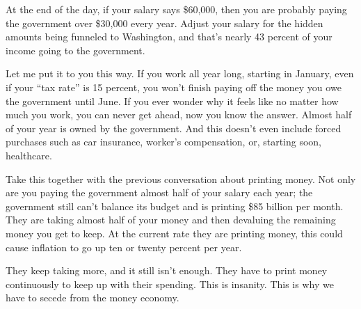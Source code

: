 At the end of the day, if your salary says \$60,000, then you are
probably paying the government over \$30,000 every year. Adjust your
salary for the hidden amounts being funneled to Washington, and that’s
nearly 43 percent of your income going to the government.

Let me put it to you this way. If you work all year long, starting in
January, even if your “tax rate” is 15 percent, you won’t finish paying
off the money you owe the government until June. If you ever wonder why
it feels like no matter how much you work, you can never get ahead, now
you know the answer. Almost half of your year is owned by the
government. And this doesn’t even include forced purchases such as car
insurance, worker’s compensation, or, starting soon, healthcare.

Take this together with the previous conversation about printing money.
Not only are you paying the government almost half of your salary each
year; the government still can’t balance its budget and is printing
\$85 billion per month. They are taking almost half of your money and
then devaluing the remaining money you get to keep. At the current rate
they are printing money, this could cause inflation to go up ten or
twenty percent per year. 

They keep taking more, and it still isn’t enough. They have to print
money continuously to
keep up with their spending. This is insanity. This is why we have to
secede from the money economy.

